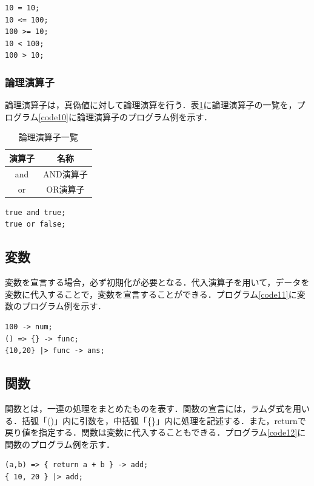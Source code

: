 \documentclass[10pt,a4j]{ltjsarticle}
\begin{document}
\begin{lstlisting}[caption=比較演算子のプログラム例, label=code09]
10 = 10;
10 <= 100;
100 >= 10; 
10 < 100;
100 > 10;
\end{lstlisting}

\subsubsection{論理演算子}
論理演算子は，真偽値に対して論理演算を行う．表\ref{tab:table03}に論理演算子の一覧を，プログラム\ref{code10}に論理演算子のプログラム例を示す．

\begin{table}[H]
 \caption{論理演算子一覧}
 \label{tab:table03}
 \centering
  \begin{tabular}{cc}
   \hline
   演算子 & 名称 \\
   \hline \hline
   and & AND演算子 \\
   or & OR演算子 \\
   \hline
  \end{tabular}
\end{table}

\begin{lstlisting}[caption=論理演算子のプログラム例, label=code10]
true and true;
true or false;
\end{lstlisting}

\subsection{変数}
変数を宣言する場合，必ず初期化が必要となる．代入演算子を用いて，データを変数に代入することで，変数を宣言することができる．プログラム\ref{code11}に変数のプログラム例を示す．

\begin{lstlisting}[caption=変数のプログラム例, label=code11]
100 -> num;
() => {} -> func;
{10,20} |> func -> ans; 
\end{lstlisting}

\subsection{関数}
関数とは，一連の処理をまとめたものを表す．関数の宣言には，ラムダ式を用いる．括弧「()」内に引数を，中括弧「\{\}」内に処理を記述する．また，returnで戻り値を指定する．関数は変数に代入することもできる．プログラム\ref{code12}に関数のプログラム例を示す．

\begin{lstlisting}[caption=関数のプログラム例, label=code12]
(a,b) => { return a + b } -> add;
{ 10, 20 } |> add;
\end{lstlisting}
\end{document}
